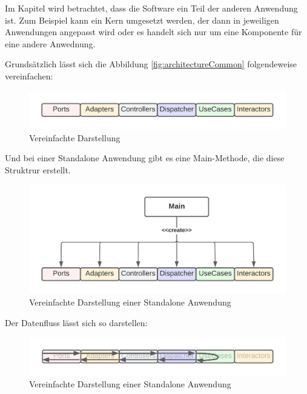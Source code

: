 Im Kapitel wird betrachtet, dass die Software ein Teil der anderen Anwendung ist.
Zum Beispiel kann ein Kern umgesetzt werden, der dann in jeweiligen Anwendungen angepasst wird 
oder es handelt sich nur um eine Komponente für eine andere Anwednung.

Grundsätzlich lässt sich die Abbildung \ref{fig:architectureCommon} folgendeweise vereinfachen:
\begin{figure}[H]
    \centering
    \includegraphics[width=1\textwidth]{./images/SimpliedArchitecture.png}
    \caption{Vereinfachte Darstellung}
    \label{fig:SimpliedArchitecture}
\end{figure}

Und bei einer Standalone Anwendung gibt es eine Main-Methode, die diese Struktrur erstellt.
\begin{figure}[H]
    \centering
    \includegraphics[width=1\textwidth]{./images/Architecture as Standalone.png}
    \caption{Vereinfachte Darstellung einer Standalone Anwendung}
    \label{fig:SimpliedArchitectureAsStandalone}
\end{figure}

Der Datenfluss lässt sich so darstellen:
\begin{figure}[H]
    \centering
    \includegraphics[width=1\textwidth]{./images/Dataflow.png}
    \caption{Vereinfachte Darstellung einer Standalone Anwendung}
    \label{fig:SimpliedArchitectureDataflow}
\end{figure}

